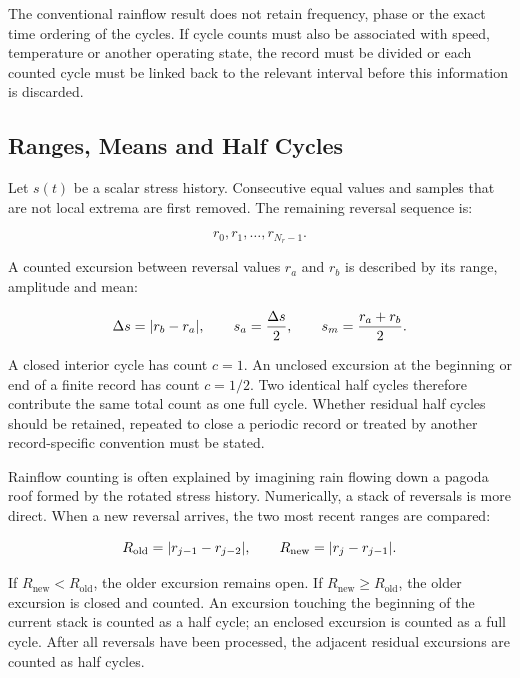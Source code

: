 The conventional rainflow result does not retain frequency, phase or the exact
time ordering of the cycles. If cycle counts must also be associated with speed,
temperature or another operating state, the record must be divided or each
counted cycle must be linked back to the relevant interval before this
information is discarded.

\subsection{Ranges, Means and Half Cycles}

Let $s(t)$ be a scalar stress history. Consecutive equal values and samples that
are not local extrema are first removed. The remaining reversal sequence is:

\begin{equation}
    r_0,r_1,\ldots,r_{N_r-1}.
\end{equation}

A counted excursion between reversal values $r_a$ and $r_b$ is described by its
range, amplitude and mean:

\begin{equation}\label{rainflow-cycle-quantities}
    \Delta s = | {r_b-r_a} |,
    \qquad
    s_a=\frac{\Delta s}{2},
    \qquad
    s_m=\frac{r_a+r_b}{2}.
\end{equation}

A closed interior cycle has count $c=1$. An unclosed excursion at the beginning
or end of a finite record has count $c=1/2$. Two identical half cycles therefore
contribute the same total count as one full cycle. Whether residual half cycles
should be retained, repeated to close a periodic record or treated by another
record-specific convention must be stated.

Rainflow counting is often explained by imagining rain flowing down a pagoda
roof formed by the rotated stress history. Numerically, a stack of reversals is
more direct. When a new reversal arrives, the two most recent ranges are
compared:

\begin{equation}
    R_{\mathrm{old}}=| {r_{j-1}-r_{j-2}} |,
    \qquad
    R_{\mathrm{new}}=| {r_j-r_{j-1}} |.
\end{equation}

If $R_{\mathrm{new}}<R_{\mathrm{old}}$, the older excursion remains open. If
$R_{\mathrm{new}}\geq R_{\mathrm{old}}$, the older excursion is closed and
counted. An excursion touching the beginning of the current stack is counted as
a half cycle; an enclosed excursion is counted as a full cycle. After all
reversals have been processed, the adjacent residual excursions are counted as
half cycles.

